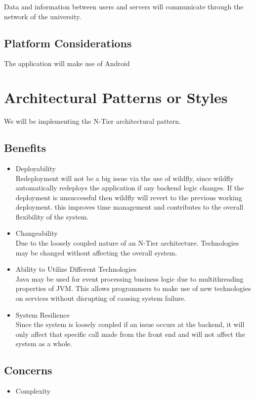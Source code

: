 \documentclass{article}
\begin{document}
Data and information between users and servers will communicate through the network of the university.

	\subsection{Platform Considerations}
	The application will make use of Android 

	\pagebreak
 	\section{Architectural Patterns or Styles}
 	We will be implementing the N-Tier architectural pattern.
 	
 		\subsection{Benefits}
 			\begin{itemize}
 				\item Deployability
 				\bigskip
 				\\
 				Redeployment will not be a big issue via the use of wildfly, since wildfly automatically redeploys the application if any backend logic changes. If the deployment is unsuccessful then wildfly will revert to the previous working deployment. this improves time management and contributes to the overall flexibility of the system.
 				\item Changeability
 				\bigskip
 				\\
 				Due to the loosely coupled nature of an N-Tier architecture. Technologies may be changed without affecting the overall system.
 				\item Ability to Utilize Different Technologies
 				\bigskip
 				\\
 				Java may be used for event processing business logic due to multithreading properties of JVM.
 				This allows programmers to make use of new technologies on services without disrupting of causing system failure.
 				\item System Resilience
 				\bigskip
 				\\
 				Since the system is loosely coupled if an issue occurs at the backend, it will only affect that specific call made from the front end and will not affect the system as a whole.
 			\end{itemize}
 		\subsection{Concerns}
 			\begin{itemize}
 				\item Complexity				
 			\end{itemize}
 			\newpage
 			
\end{document}
